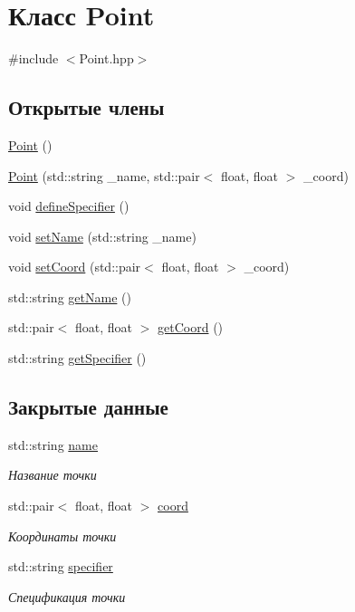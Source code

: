 \hypertarget{class_point}{}\section{Класс Point}
\label{class_point}


{\ttfamily \#include $<$Point.\+hpp$>$}

\subsection*{Открытые члены}
\begin{DoxyCompactItemize}
\item 
\hyperlink{class_point_ad92f2337b839a94ce97dcdb439b4325a}{Point} ()
\item 
\hyperlink{class_point_afcb5f4743143820f8418062939c7e475}{Point} (std\+::string \+\_\+name, std\+::pair$<$ float, float $>$ \+\_\+coord)
\item 
void \hyperlink{class_point_a8148ed0cab6539736eb8708d95b81c24}{define\+Specifier} ()
\item 
void \hyperlink{class_point_a47f8c8d9f3b6819b7af24cdd8ff346be}{set\+Name} (std\+::string \+\_\+name)
\item 
void \hyperlink{class_point_af7b45c6fc8ea986aa4a384e6d2b8e19f}{set\+Coord} (std\+::pair$<$ float, float $>$ \+\_\+coord)
\item 
std\+::string \hyperlink{class_point_ae7068a5266527ee42c112d49a3e0e891}{get\+Name} ()
\item 
std\+::pair$<$ float, float $>$ \hyperlink{class_point_a46697b576cc5e567b48c2a4f656ecb71}{get\+Coord} ()
\item 
std\+::string \hyperlink{class_point_ad9890d97de2292b8108afc132bdadbc3}{get\+Specifier} ()
\end{DoxyCompactItemize}
\subsection*{Закрытые данные}
\begin{DoxyCompactItemize}
\item 
std\+::string \hyperlink{class_point_af52ec9c5dc533d46c1a67b4bbdaeae23}{name}
\begin{DoxyCompactList}\small\item\em Название точки \end{DoxyCompactList}\item 
std\+::pair$<$ float, float $>$ \hyperlink{class_point_a681ea559a4915bf941db0204dc4f25a4}{coord}
\begin{DoxyCompactList}\small\item\em Координаты точки \end{DoxyCompactList}\item 
std\+::string \hyperlink{class_point_a5bae0fb50a1d54466360d018f800925b}{specifier}
\begin{DoxyCompactList}\small\item\em Спецификация точки \end{DoxyCompactList}\end{DoxyCompactItemize}
